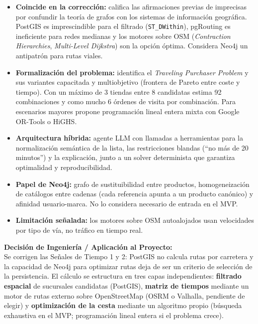 \begin{tcolorbox}[colback=responsecolor, title=Insights de Gemini, colframe=gray!60!black, breakable]
	\begin{itemize}
		\item \textbf{Coincide en la corrección:} califica las afirmaciones previas de imprecisas por confundir la teoría de grafos con los sistemas de información geográfica. PostGIS es imprescindible para el filtrado (\texttt{ST\_DWithin}), pgRouting es ineficiente para redes medianas y los motores sobre OSM (\textit{Contraction Hierarchies}, \textit{Multi-Level Dijkstra}) son la opción óptima. Considera Neo4j un antipatrón para rutas viales.

		\item \textbf{Formalización del problema:} identifica el \textit{Traveling Purchaser Problem} y sus variantes capacitada y multiobjetivo (frontera de Pareto entre coste y tiempo). Con un máximo de 3 tiendas entre 8 candidatas estima 92 combinaciones y como mucho 6 órdenes de visita por combinación. Para escenarios mayores propone programación lineal entera mixta con Google OR-Tools o HiGHS.

		\item \textbf{Arquitectura híbrida:} agente LLM con llamadas a herramientas para la normalización semántica de la lista, las restricciones blandas (``no más de 20 minutos'') y la explicación, junto a un solver determinista que garantiza optimalidad y reproducibilidad.

		\item \textbf{Papel de Neo4j:} grafo de sustituibilidad entre productos, homogeneización de catálogos entre cadenas (cada referencia apunta a un producto canónico) y afinidad usuario-marca. No lo considera necesario de entrada en el MVP.

		\item \textbf{Limitación señalada:} los motores sobre OSM autoalojados usan velocidades por tipo de vía, no tráfico en tiempo real.
	\end{itemize}
\end{tcolorbox}

\textbf{Decisión de Ingeniería / Aplicación al Proyecto:} \\
Se corrigen las Señales de Tiempo 1 y 2: PostGIS no calcula rutas por carretera y la capacidad de Neo4j para optimizar rutas deja de ser un criterio de selección de la persistencia. El cálculo se estructura en tres capas independientes: \textbf{filtrado espacial} de sucursales candidatas (PostGIS), \textbf{matriz de tiempos} mediante un motor de rutas externo sobre OpenStreetMap (OSRM o Valhalla, pendiente de elegir) y \textbf{optimización de la cesta} mediante un algoritmo propio (búsqueda exhaustiva en el MVP; programación lineal entera si el problema crece).

